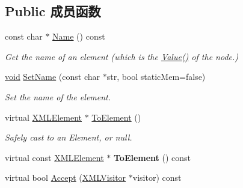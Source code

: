 \subsection*{Public 成员函数}
\begin{DoxyCompactItemize}
\item 
\mbox{\label{classtinyxml2_1_1_x_m_l_element_a63e057fb5baee1dd29f323cb85907b35}} 
const char $\ast$ \hyperlink{classtinyxml2_1_1_x_m_l_element_a63e057fb5baee1dd29f323cb85907b35}{Name} () const
\begin{DoxyCompactList}\small\item\em Get the name of an element (which is the \hyperlink{classtinyxml2_1_1_x_m_l_node_a0485e51c670e741884cfd8362274d680}{Value()} of the node.) \end{DoxyCompactList}\item 
\mbox{\label{classtinyxml2_1_1_x_m_l_element_a97712009a530d8cb8a63bf705f02b4f1}} 
\hyperlink{interfacevoid}{void} \hyperlink{classtinyxml2_1_1_x_m_l_element_a97712009a530d8cb8a63bf705f02b4f1}{Set\+Name} (const char $\ast$str, bool static\+Mem=false)
\begin{DoxyCompactList}\small\item\em Set the name of the element. \end{DoxyCompactList}\item 
\mbox{\label{classtinyxml2_1_1_x_m_l_element_ad9ff5c2dbc15df36cf664ce1b0ea0a5d}} 
virtual \hyperlink{classtinyxml2_1_1_x_m_l_element}{X\+M\+L\+Element} $\ast$ \hyperlink{classtinyxml2_1_1_x_m_l_element_ad9ff5c2dbc15df36cf664ce1b0ea0a5d}{To\+Element} ()
\begin{DoxyCompactList}\small\item\em Safely cast to an Element, or null. \end{DoxyCompactList}\item 
\mbox{\label{classtinyxml2_1_1_x_m_l_element_afeb353047ab8532191709dcaef07337e}} 
virtual const \hyperlink{classtinyxml2_1_1_x_m_l_element}{X\+M\+L\+Element} $\ast$ {\bfseries To\+Element} () const
\item 
virtual bool \hyperlink{classtinyxml2_1_1_x_m_l_element_a9b2119831e8b85827d5d3e5076788e4a}{Accept} (\hyperlink{classtinyxml2_1_1_x_m_l_visitor}{X\+M\+L\+Visitor} $\ast$visitor) const

\end{DoxyCompactItemize}
